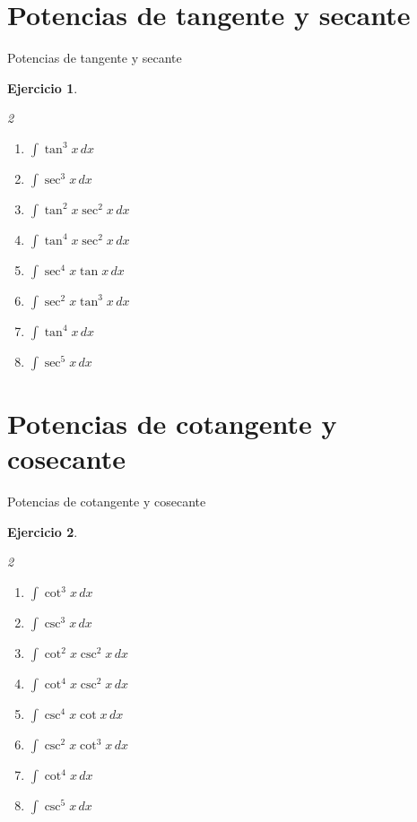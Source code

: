 \documentclass[10pt,aspectratio=169]{beamer}
\newtheorem{Ejer}{Ejercicio}
\begin{document}
\section{Potencias de tangente y secante}
\begin{frame}{Potencias de tangente y secante}
\begin{Ejer}
\begin{multicols}{2}
\begin{enumerate}
\item $\displaystyle \int \tan^3x\,dx$
\item $\displaystyle \int \sec^3x\,dx$
\item $\displaystyle \int \tan^2x\sec^2x\,dx$
\item $\displaystyle \int \tan^4x\sec^2x\,dx$
\item $\displaystyle \int \sec^4x\tan x\,dx$
\item $\displaystyle \int \sec^2x\tan^3x\,dx$
\item $\displaystyle \int \tan^4x\,dx$
\item $\displaystyle \int \sec^5x\,dx$
\end{enumerate}
\end{multicols}
\end{Ejer}
\end{frame}

\section{Potencias de cotangente y cosecante}
\begin{frame}{Potencias de cotangente y cosecante}
\begin{Ejer}
\begin{multicols}{2}
\begin{enumerate}
\item $\displaystyle \int \cot^3x\,dx$
\item $\displaystyle \int \csc^3x\,dx$
\item $\displaystyle \int \cot^2x\csc^2x\,dx$
\item $\displaystyle \int \cot^4x\csc^2x\,dx$
\item $\displaystyle \int \csc^4x\cot x\,dx$
\item $\displaystyle \int \csc^2x\cot^3x\,dx$
\item $\displaystyle \int \cot^4x\,dx$
\item $\displaystyle \int \csc^5x\,dx$
\end{enumerate}
\end{multicols}
\end{Ejer}
\end{frame}
\end{document}
